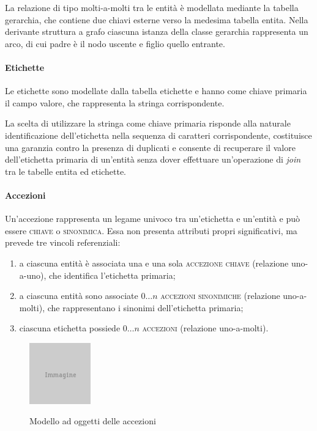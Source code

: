 La relazione di tipo molti-a-molti tra le entità è modellata mediante la tabella \textsf{gerarchia}, che contiene due chiavi esterne verso la medesima tabella \textsf{entita}. Nella derivante struttura a grafo ciascuna istanza della classe \textsf{gerarchia} rappresenta un arco, di cui \textsf{padre} è il nodo uscente e \textsf{figlio} quello entrante.

\paragraph{Etichette}
Le etichette sono modellate dalla tabella \textsf{etichette} e hanno come chiave primaria il campo \textsf{valore}, che rappresenta la stringa corrispondente.

La scelta di utilizzare la stringa come chiave primaria risponde alla naturale identificazione dell'etichetta nella sequenza di caratteri corrispondente, costituisce una garanzia contro la presenza di duplicati e consente di recuperare il valore dell'etichetta primaria di un'entità senza dover effettuare un'operazione di \textit{join} tra le tabelle \textsf{entita} ed \textsf{etichette}.

\paragraph{Accezioni}
Un'accezione rappresenta un legame univoco tra un'etichetta e un'entità e può essere \textsc{chiave} o \textsc{sinonimica}. Essa non presenta attributi propri significativi, ma prevede tre vincoli referenziali:
\begin{enumerate}
\item a ciascuna entità è associata una e una sola \textsc{accezione chiave} (relazione uno-a-uno), che identifica l'etichetta primaria;
\item a ciascuna entità sono associate $0\ldots n$ \textsc{accezioni sinonimiche} (relazione uno-a-molti), che rappresentano i sinonimi dell'etichetta primaria;
\item ciascuna etichetta possiede $0\ldots n$ \textsc{accezioni} (relazione uno-a-molti).
\end{enumerate}

\begin{figure}[ht]
\begin{center}
\includegraphics{placeholder.png}
\label{fig:tesi:stage:er:accezioni}
\caption{Modello ad oggetti delle accezioni}
\end{center}
\end{figure}

